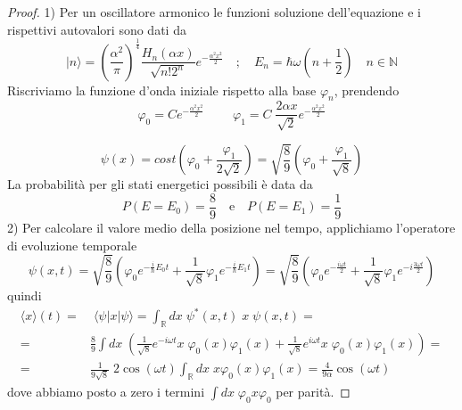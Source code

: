 \begin{proof}
1) Per un oscillatore armonico le funzioni soluzione dell'equazione e i rispettivi autovalori sono dati da 
\begin{equation*}
	|n \rangle = \left( \frac{\alpha^2}{\pi} \right)^{\frac{1}{4}} \frac{H_n(\alpha x)}{\sqrt{n!2^n}}e^{-\frac{\alpha^2 x^2}{2}} \quad ; \quad E_n = \hbar \omega \left ( n + \frac{1}{2}\right) \quad n \in \mathbb{N}
\end{equation*}
Riscriviamo la funzione d'onda iniziale rispetto alla base $\varphi_n$, prendendo
\begin{equation*}
	\varphi_0 = C e^{-\frac{\alpha^2 x^2}{2}} \quad \; \quad \varphi_1 = C \; \frac{2 \alpha x}{\sqrt{2}}e^{- \frac{\alpha^2x^2}{2}}
\end{equation*}
\newpage

\begin{equation*}
	\psi(x) = cost \left ( \varphi_0 + \frac{\varphi_1}{2\sqrt{2}}\right) = \sqrt{\frac{8}{9}} \left ( \varphi_0 + \frac{\varphi_1}{\sqrt{8}}\right)
\end{equation*}
La probabilit\`a per gli stati energetici possibili \`e data da 
\begin{equation*}
	P(E=E_0) = \frac{8}{9} \quad \text{e} \quad P(E=E_1) = \frac{1}{9}
\end{equation*}
2) Per calcolare il valore medio della posizione nel tempo, applichiamo  l'operatore di evoluzione temporale 
\begin{equation*}
	\psi(x,t) = \sqrt{\frac{8}{9}} \left (  \varphi_0 e^{-\frac{i}{\hbar}E_0t} + \frac{1}{\sqrt{8}} \varphi_1e^{-\frac{i}{\hbar}E_1t}\right) = \sqrt{\frac{8}{9}} \left ( \varphi_0 e^{-\frac{i\omega t}{2}} + \frac{1}{\sqrt{8}}\varphi_1 e^{-i \frac{3 \omega t}{2}}\right)
\end{equation*}
quindi
\begin{align*}
	\langle x \rangle (t) = & \; \langle \psi |x |\psi \rangle = \int_{\mathbb{R}}dx \;  \psi^*(x,t) \; x \;\psi(x,t)  = \\[0.5cm]
	 = & \frac{8}{9} \int dx \; \left( \frac{1}{\sqrt{8}} e^{-i \omega t}x \; \varphi_0(x)\varphi_1(x) + \frac{1}{\sqrt{8}} e^{i \omega t}x \; \varphi_0(x) \varphi_1(x)\right) = \\[0.5cm] 
	 = & \frac{1}{9 \sqrt{8}}  \; 2 \cos(\omega t) \int_{\mathbb{R}}dx \; x\varphi_0(x) \varphi_1(x) = \frac{4}{9 \alpha} \cos(\omega t)
\end{align*}
dove abbiamo posto a zero i termini $\int dx \; \varphi_0 x \varphi_0$ per parit\`a.

\end{proof}


